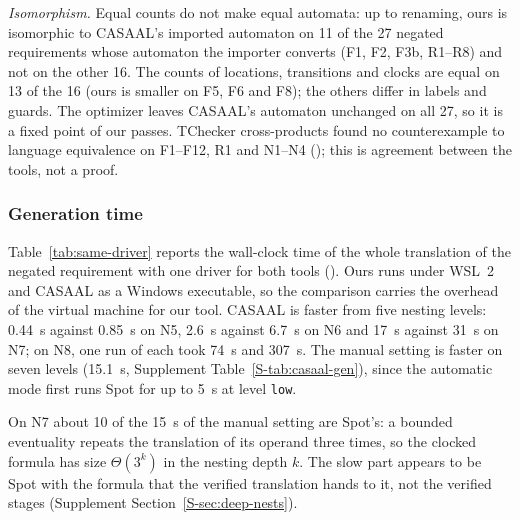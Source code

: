 \emph{Isomorphism.} Equal counts do not make equal automata: up to renaming, ours is isomorphic to CASAAL's imported automaton on 11 of the 27 negated requirements whose automaton the importer converts (F1, F2, F3b, R1--R8) and not on the other 16. The counts of locations, transitions and clocks are equal on 13 of the 16 (ours is smaller on F5, F6 and F8); the others differ in labels and guards. The optimizer leaves CASAAL's automaton unchanged on all 27, so it is a fixed point of our passes. TChecker cross-products found no counterexample to language equivalence on F1--F12, R1 and N1--N4 (); this is agreement between the tools, not a proof.

\subsubsection{Generation time}
\label{sec:casaal-time}
\begin{table}[tp]
\centering
\caption{Negated requirements: CASAAL against \texttt{mtl2tba}. Size is reachable
locations/transitions of the automaton given to the model checker (ours: after
optimization). Times are wall-clock medians of five runs for the whole translation
(for ours: generation, optimization and export, in automatic mode), both tools launched
by one driver on the same machine, CASAAL as the native Windows executable and ours under
WSL~2. N8 is a single run of each tool. The rows are a selection; the other patterns are in the supplement. Supplement Table~\ref{S-tab:casaal-gen}
gives earlier runs, with the manual setting.}
\label{tab:same-driver}
\small

\end{table}
Table~\ref{tab:same-driver} reports the wall-clock time of the whole translation of the negated requirement with one driver for both tools (). Ours runs under WSL~2 and CASAAL as a Windows executable, so the comparison carries the overhead of the virtual machine for our tool. CASAAL is faster from five nesting levels: 0.44~s against 0.85~s on N5, 2.6~s against 6.7~s on N6 and 17~s against 31~s on N7; on N8, one run of each took 74~s and 307~s. The manual setting is faster on seven levels (15.1~s, Supplement Table~\ref{S-tab:casaal-gen}), since the automatic mode first runs Spot for up to 5~s at level \texttt{low}.

On N7 about 10 of the 15~s of the manual setting are Spot's: a bounded eventuality repeats the translation of its operand three times, so the clocked formula has size $\Theta(3^k)$ in the nesting depth $k$. The slow part appears to be Spot with the formula that the verified translation hands to it, not the verified stages (Supplement Section~\ref{S-sec:deep-nests}).

